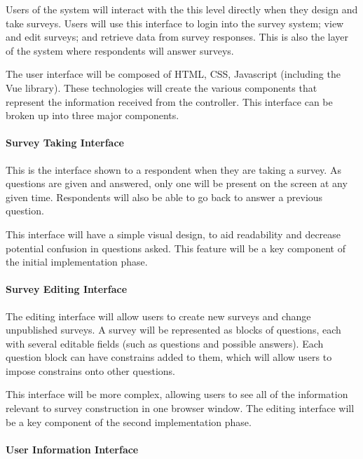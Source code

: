 \documentclass{article}
\begin{document}
Users of the system will interact with the this level directly when
they design and take surveys.  Users will use this interface to login
into the survey system; view and edit surveys; and retrieve data from
survey responses.  This is also the layer of the system where
respondents will answer surveys.

The user interface will be composed of HTML, CSS, Javascript
(including the Vue library).  These technologies will create the
various components that represent the information received from the
controller.  This interface can be broken up into three major
components.

\paragraph{Survey Taking Interface}
\label{sec:surv-taking-interf}

This is the interface shown to a respondent when they are taking a
survey.  As questions are given and answered, only one will be present
on the screen at any given time.  Respondents will also be able to go
back to answer a previous question.

This interface will have a simple visual design, to aid readability
and decrease potential confusion in questions asked.  This feature
will be a key component of the initial implementation phase.

\paragraph{Survey Editing Interface}
\label{sec:surv-edit-interf}

The editing interface will allow users to create new surveys and
change unpublished surveys.  A survey will be represented as blocks of
questions, each with several editable fields (such as questions and
possible answers).  Each question block can have constrains added to
them, which will allow users to impose constrains onto other
questions.

This interface will be more complex, allowing users to see all of the
information relevant to survey construction in one browser window.
The editing interface will be a key component of the second
implementation phase.

\paragraph{User Information Interface}
\label{sec:user-infor-interf}
\end{document}
